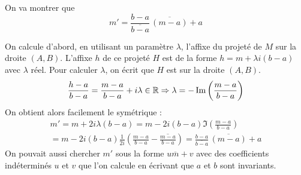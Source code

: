 On va montrer que
\begin{displaymath}
 m' = \frac{b-a}{\overline{b-a}}\,\overline{(m-a)} +a
\end{displaymath}

On calcule d'abord, en utilisant un paramètre $\lambda$, l'affixe du projeté de $M$ sur la droite $(A,B)$.
L'affixe $h$ de ce projeté $H$ est de la forme $h=m+\lambda i (b-a)$ avec $\lambda$ réel. Pour calculer $\lambda$, on écrit que $H$ est sur la droite $(A,B)$.
\begin{displaymath}
 \frac{h-a}{b-a}=\frac{m-a}{b-a}+ i\lambda \in \mathbb{R}
\Rightarrow \lambda = -\operatorname{Im}\left(\frac{m-a}{b-a} \right) 
\end{displaymath}
On obtient alors facilement le symétrique :
\begin{multline*}
 m' = m + 2i\lambda (b-a) = m -2i(b-a)\Im\left(\frac{m-a}{b-a} \right)\\
= m-2i(b-a)\frac{1}{2i}\left(\frac{m-a}{b-a} -\overline{\frac{m-a}{b-a}} \right) 
=\frac{b-a}{\overline{b-a}}\,\overline{(m-a)} +a
\end{multline*}
On pouvait aussi chercher $m'$ sous la forme $u\overline{m}+v$ avec des coefficients indéterminés $u$ et $v$ que l'on calcule en écrivant que $a$ et $b$ sont invariants.